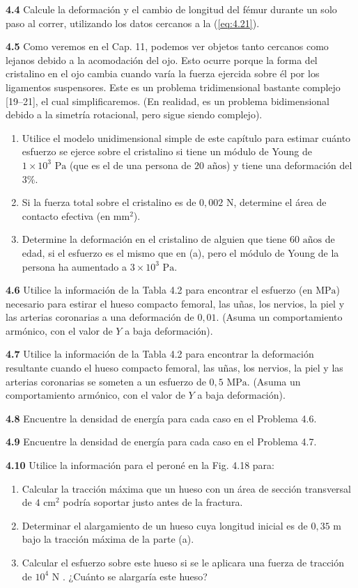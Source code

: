 \documentclass[12pt]{book}
\begin{document}
\textbf{4.4} Calcule la deformación y el cambio de longitud del fémur durante un solo paso al correr, utilizando los datos cercanos a la (\ref{eq:4.21}).

\textbf{4.5} Como veremos en el Cap. 11, podemos ver objetos tanto cercanos como lejanos debido a la acomodación del ojo. Esto ocurre porque la forma del cristalino en el ojo cambia cuando varía la fuerza ejercida sobre él por los ligamentos suspensores. Este es un problema tridimensional bastante complejo [19--21], el cual simplificaremos. (En realidad, es un problema bidimensional debido a la simetría rotacional, pero sigue siendo complejo).
\begin{enumerate}
  \item[(a)] Utilice el modelo unidimensional simple de este capítulo para estimar cuánto esfuerzo se ejerce sobre el cristalino si tiene un módulo de Young de $1 \times 10^3\text{ Pa}$ (que es el de una persona de $20\text{ años}$) y tiene una deformación del $3\%$.
  \item[(b)] Si la fuerza total sobre el cristalino es de $0,002\text{ N}$, determine el área de contacto efectiva (en $\text{mm}^2$).
  \item[(c)] Determine la deformación en el cristalino de alguien que tiene $60\text{ años}$ de edad, si el esfuerzo es el mismo que en (a), pero el módulo de Young de la persona ha aumentado a $3 \times 10^3\text{ Pa}$.
\end{enumerate}

\textbf{4.6} Utilice la información de la Tabla 4.2 para encontrar el esfuerzo (en $\text{MPa}$) necesario para estirar el hueso compacto femoral, las uñas, los nervios, la piel y las arterias coronarias a una deformación de $0,01$. (Asuma un comportamiento armónico, con el valor de $Y$ a baja deformación).

\textbf{4.7} Utilice la información de la Tabla 4.2 para encontrar la deformación resultante cuando el hueso compacto femoral, las uñas, los nervios, la piel y las arterias coronarias se someten a un esfuerzo de $0,5\text{ MPa}$. (Asuma un comportamiento armónico, con el valor de $Y$ a baja deformación).

\textbf{4.8} Encuentre la densidad de energía para cada caso en el Problema 4.6.

\textbf{4.9} Encuentre la densidad de energía para cada caso en el Problema 4.7.

\textbf{4.10} Utilice la información para el peroné en la Fig. 4.18 para:
\begin{enumerate}
  \item[(a)] Calcular la tracción máxima que un hueso con un área de sección transversal de $4\text{ cm}^2$ podría soportar justo antes de la fractura.
  \item[(b)] Determinar el alargamiento de un hueso cuya longitud inicial es de $0,35\text{ m}$ bajo la tracción máxima de la parte (a).
  \item[(c)] Calcular el esfuerzo sobre este hueso si se le aplicara una fuerza de tracción de $10^4\text{ N}$ \cite{10}. ¿Cuánto se alargaría este hueso?
\end{enumerate}
\end{document}
